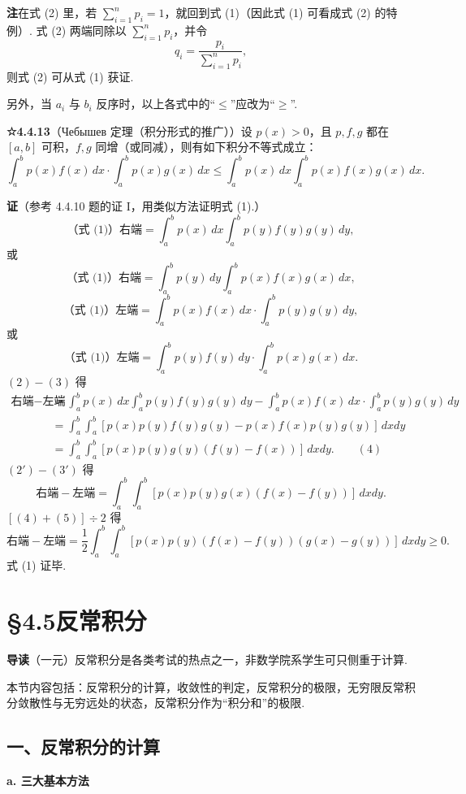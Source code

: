 \documentclass[UTF8,12pt,a4paper,fontset=fandol]{ctexart}
\begin{document}
\noindent\textbf{注}\quad 在式 (2) 里，若 $\sum_{i=1}^n p_i=1$，就回到式 (1)（因此式 (1) 可看成式 (2) 的特例）. 式 (2) 两端同除以 $\sum_{i=1}^n p_i$，并令
\[
q_i=\frac{p_i}{\sum_{i=1}^n p_i},
\]
则式 (2) 可从式 (1) 获证.

另外，当 $a_i$ 与 $b_i$ 反序时，以上各式中的“$\le$”应改为“$\ge$”.

\noindent\textbf{☆4.4.13}\quad （Чебышев 定理（积分形式的推广））设 $p(x)>0$，且 $p,f,g$ 都在 $[a,b]$ 可积，$f,g$ 同增（或同减），则有如下积分不等式成立：
\[
\int_a^b p(x)f(x)\,dx\cdot\int_a^b p(x)g(x)\,dx
\le\int_a^b p(x)\,dx\int_a^b p(x)f(x)g(x)\,dx. \tag{1}
\]

\noindent\textbf{证}\quad （参考 4.4.10 题的证 I，用类似方法证明式 (1).）
\[
\text{（式 (1)）右端}
=\int_a^b p(x)\,dx\int_a^b p(y)f(y)g(y)\,dy, \tag{2}
\]
或
\[
\text{（式 (1)）右端}
=\int_a^b p(y)\,dy\int_a^b p(x)f(x)g(x)\,dx, \tag{$2'$}
\]
\[
\text{（式 (1)）左端}
=\int_a^b p(x)f(x)\,dx\cdot\int_a^b p(y)g(y)\,dy, \tag{3}
\]
或
\[
\text{（式 (1)）左端}
=\int_a^b p(y)f(y)\,dy\cdot\int_a^b p(x)g(x)\,dx. \tag{$3'$}
\]
$(2)-(3)$ 得
\[
\begin{aligned}
\text{右端}-\text{左端}
&=\int_a^b p(x)\,dx\int_a^b p(y)f(y)g(y)\,dy
-\int_a^b p(x)f(x)\,dx\cdot\int_a^b p(y)g(y)\,dy\\
&=\int_a^b\int_a^b
[p(x)p(y)f(y)g(y)-p(x)f(x)p(y)g(y)]\,dxdy\\
&=\int_a^b\int_a^b[p(x)p(y)g(y)(f(y)-f(x))]\,dxdy. \qquad(4)
\end{aligned}
\]
$(2')-(3')$ 得
\[
\text{右端}-\text{左端}
=\int_a^b\int_a^b[p(x)p(y)g(x)(f(x)-f(y))]\,dxdy. \tag{5}
\]
$[(4)+(5)]\div2$ 得
\[
\text{右端}-\text{左端}
=\frac12\int_a^b\int_a^b
[p(x)p(y)(f(x)-f(y))(g(x)-g(y))]\,dxdy\ge0.
\]
式 (1) 证毕.

\section*{§4.5\quad 反常积分}

\noindent\textbf{导读}\quad （一元）反常积分是各类考试的热点之一，非数学院系学生可只侧重于计算.

本节内容包括：反常积分的计算，收敛性的判定，反常积分的极限，无穷限反常积分敛散性与无穷远处的状态，反常积分作为“积分和”的极限.

\subsection*{一、反常积分的计算}

\noindent\textbf{a. 三大基本方法}
\end{document}
